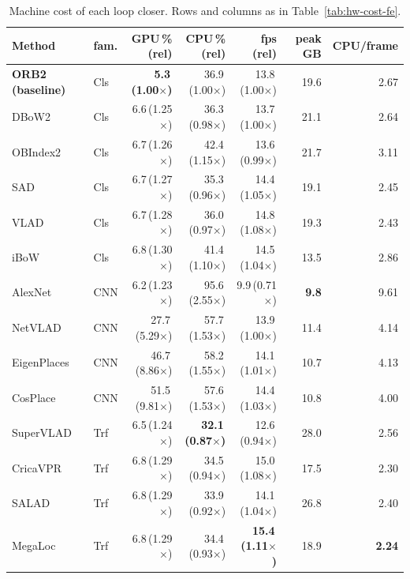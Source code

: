 \begin{table}[H]
\centering
\caption{Machine cost of each loop closer. Rows and columns as in Table~\ref{tab:hw-cost-fe}.}
\label{tab:hw-cost-lc}
\footnotesize
\setlength{\tabcolsep}{4pt}
\begin{tabular}{@{}llrrrrr@{}}
\toprule
\textbf{Method} & \textbf{fam.} & \textbf{GPU\,\% (rel)} & \textbf{CPU\,\% (rel)} & \textbf{fps (rel)} & \textbf{peak GB} & \textbf{CPU/frame} \\
\midrule
\textbf{ORB2 (baseline)} & Cls & \textbf{5.3\,(1.00$\times$)} & 36.9\,(1.00$\times$) & 13.8\,(1.00$\times$) & 19.6 & 2.67 \\
DBoW2 & Cls & 6.6\,(1.25$\times$) & 36.3\,(0.98$\times$) & 13.7\,(1.00$\times$) & 21.1 & 2.64 \\
OBIndex2 & Cls & 6.7\,(1.26$\times$) & 42.4\,(1.15$\times$) & 13.6\,(0.99$\times$) & 21.7 & 3.11 \\
SAD & Cls & 6.7\,(1.27$\times$) & 35.3\,(0.96$\times$) & 14.4\,(1.05$\times$) & 19.1 & 2.45 \\
VLAD & Cls & 6.7\,(1.28$\times$) & 36.0\,(0.97$\times$) & 14.8\,(1.08$\times$) & 19.3 & 2.43 \\
iBoW & Cls & 6.8\,(1.30$\times$) & 41.4\,(1.10$\times$) & 14.5\,(1.04$\times$) & 13.5 & 2.86 \\
AlexNet & CNN & 6.2\,(1.23$\times$) & 95.6\,(2.55$\times$) & 9.9\,(0.71$\times$) & \textbf{9.8} & 9.61 \\
NetVLAD & CNN & 27.7\,(5.29$\times$) & 57.7\,(1.53$\times$) & 13.9\,(1.00$\times$) & 11.4 & 4.14 \\
EigenPlaces & CNN & 46.7\,(8.86$\times$) & 58.2\,(1.55$\times$) & 14.1\,(1.01$\times$) & 10.7 & 4.13 \\
CosPlace & CNN & 51.5\,(9.81$\times$) & 57.6\,(1.53$\times$) & 14.4\,(1.03$\times$) & 10.8 & 4.00 \\
SuperVLAD & Trf & 6.5\,(1.24$\times$) & \textbf{32.1\,(0.87$\times$)} & 12.6\,(0.94$\times$) & 28.0 & 2.56 \\
CricaVPR & Trf & 6.8\,(1.29$\times$) & 34.5\,(0.94$\times$) & 15.0\,(1.08$\times$) & 17.5 & 2.30 \\
SALAD & Trf & 6.8\,(1.29$\times$) & 33.9\,(0.92$\times$) & 14.1\,(1.04$\times$) & 26.8 & 2.40 \\
MegaLoc & Trf & 6.8\,(1.29$\times$) & 34.4\,(0.93$\times$) & \textbf{15.4\,(1.11$\times$)} & 18.9 & \textbf{2.24} \\
\bottomrule
\end{tabular}
\end{table}
